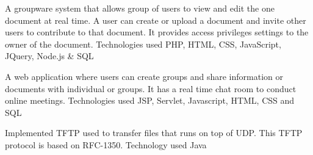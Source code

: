 \documentclass[]{main}
\begin{document}
\begin{minipage}[t]{0.73\textwidth}
 
A groupware system that allows group of users to view and edit the one document at real time. 
A user can create or upload a document and invite other users to contribute to that document. 
It provides access privileges settings to the owner of the document.
Technologies used PHP, HTML, CSS, JavaScript, JQuery, Node.js \& SQL
\sectionsep

 
A web application where users can create groups and share information or documents with individual or groups.
It has a real time chat room to conduct online meetings.
Technologies used JSP, Servlet, Javascript, HTML, CSS and SQL
\sectionsep

 
Implemented TFTP used to transfer files that runs on top of UDP. This TFTP protocol is based on RFC-1350.
Technology used Java
\sectionsep

\end{minipage}
\end{document}
